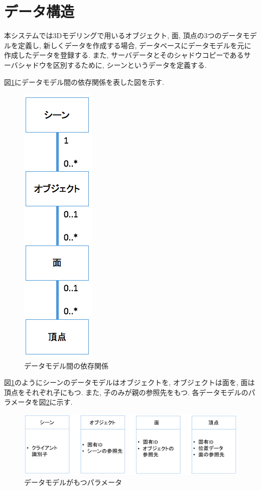 \section{データ構造}
本システムでは3Dモデリングで用いるオブジェクト, 面, 頂点の3つのデータモデルを定義し, 新しくデータを作成する場合, データベースにデータモデルを元に作成したデータを登録する.
また, サーバデータとそのシャドウコピーであるサーバシャドウを区別するために, シーンというデータを定義する.
\par
図\ref{データ構造}にデータモデル間の依存関係を表した図を示す.
\begin{figure}[]
  \begin{center}
    \includegraphics[scale=0.5]{images/er}
    \caption{データモデル間の依存関係}
    \label{データ構造}
  \end{center}
\end{figure}
図\ref{データ構造}のようにシーンのデータモデルはオブジェクトを, オブジェクトは面を, 面は頂点をそれぞれ子にもつ. また, 子のみが親の参照先をもつ.
各データモデルのパラメータを図\ref{パラメータ}に示す.
\begin{figure}[]
  \begin{center}
    \includegraphics[scale=0.3]{images/prop}
    \caption{データモデルがもつパラメータ}
    \label{パラメータ}
  \end{center}
\end{figure}
